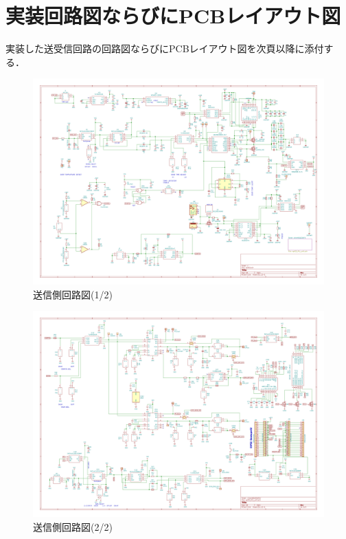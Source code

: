 \chapter{実装回路図ならびにPCBレイアウト図}
実装した送受信回路の回路図ならびにPCBレイアウト図を次頁以降に添付する．

\begin{landscape}
\begin{figure}[p]
\begin{center}

\includegraphics[width=220mm]{figures/wpf13_circuit1.pdf}
  \caption{送信側回路図(1/2)}

  \end{center}
\end{figure}
\end{landscape}


\begin{landscape}
\begin{figure}[p]
\begin{center}

\includegraphics[width=220mm]{figures/wpf13_circuit2.pdf}
  \caption{送信側回路図(2/2)}

  \end{center}
\end{figure}
\end{landscape}


